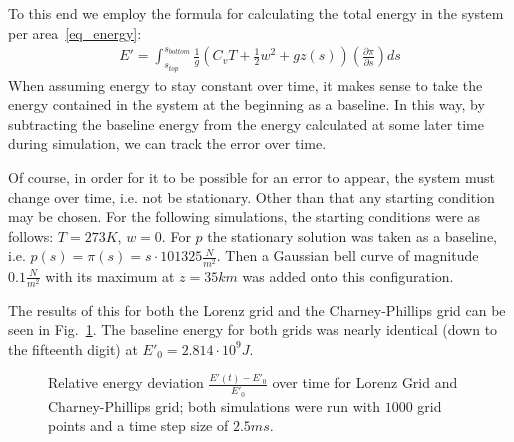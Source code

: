 To this end we employ the formula for calculating the total energy in the system per area~\ref{eq_energy}:
\begin{align*}
E'=\int_{s_{top}}^{s_{bottom}} \frac{1}{g}(C_vT+\frac{1}{2}w^2 + gz(s)) \left( \frac{\partial \pi}{\partial s} \right) ds
\end{align*}
When assuming energy to stay constant over time, it makes sense to take the energy contained in the system at the beginning as a baseline.
In this way, by subtracting the baseline energy from the energy calculated at some later time during simulation, we can track the error over time.

Of course, in order for it to be possible for an error to appear, the system must change over time, i.e. not be stationary.
Other than that any starting condition may be chosen.
For the following simulations, the starting conditions were as follows: $T=273K$, $w=0$.
For $p$ the stationary solution was taken as a baseline, i.e. $p(s)=\pi (s)=s\cdot 101325\frac{N}{m^2}$.
Then a Gaussian bell curve of magnitude $0.1\frac{N}{m^2}$ with its maximum at $z=35km$ was added onto this configuration.

The results of this for both the Lorenz grid and the Charney-Phillips grid can be seen in Fig.~\ref{fig:energy_error}.
The baseline energy for both grids was nearly identical (down to the fifteenth digit) at $E'_0=2.814\cdot 10^9J$. %

\begin{figure}[!h]
    \caption{Relative energy deviation $\frac{E'(t)-E'_0}{E'_0}$ over time for Lorenz Grid and Charney-Phillips grid;
    both simulations were run with $1000$ grid points and a time step size of $2.5ms$.}
    \label{fig:energy_error}
\end{figure}

